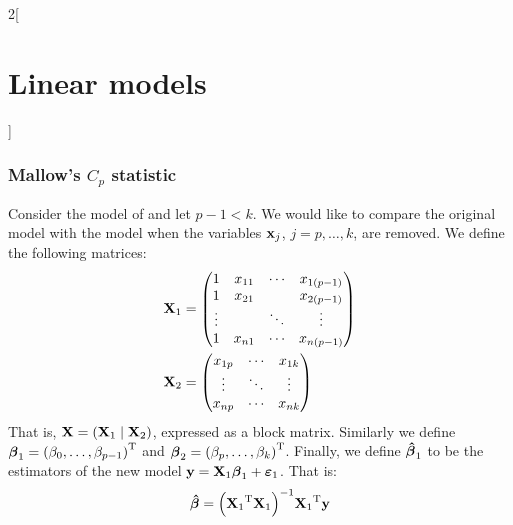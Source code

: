 \documentclass[../../../main_math.tex]{subfiles}
\begin{document}
\begin{multicols}{2}[\section{Linear models}]
\begin{theorem}
  \end{theorem}
  \subsubsection{Mallow's \texorpdfstring{$C_p$}{Cp} statistic}
  \begin{definition}
    Consider the model of  and let $p-1<k$. We would like to compare the original model with the model when the variables $\boldsymbol{\mathrm{x}}_j$, $j=p,\ldots,k$, are removed. We define the following matrices:
    \begin{align*}
      \boldsymbol{\mathrm{X}}_1 & =\begin{pmatrix}
                    1      & x_{11} & \cdots & x_{1(p-1)} \\
                    1      & x_{21} &        & x_{2(p-1)} \\
                    \vdots &        & \ddots & \vdots     \\
                    1      & x_{n1} & \cdots & x_{n(p-1)}
                  \end{pmatrix} \\
      \boldsymbol{\mathrm{X}}_2 & =\begin{pmatrix}
                    x_{1p} & \cdots & x_{1k} \\
                    \vdots & \ddots & \vdots \\
                    x_{np} & \cdots & x_{nk}
                  \end{pmatrix}
    \end{align*}
    That is, $\boldsymbol{\mathrm{X}}=(\boldsymbol{\mathrm{X}}_1 \mid \boldsymbol{\mathrm{X}}_2)$, expressed as a block matrix. Similarly we define $\boldsymbol{\mathrm{\beta}}_1={(\beta_0,\ldots,\beta_{p-1})}^{\mathrm{T}}$ and $\boldsymbol{\mathrm{\beta}}_2={(\beta_p,\ldots,\beta_{k})}^{\mathrm{T}}$. Finally, we define $\boldsymbol{\mathrm{\hat\beta}}_1$ to be the estimators of the new model $\boldsymbol{\mathrm{y}}=\boldsymbol{\mathrm{X}}_1\boldsymbol{\mathrm{\beta}}_1+\boldsymbol{\mathrm{\varepsilon}}_1$. That is: $$\boldsymbol{\mathrm{\hat\beta}}={\left({\boldsymbol{\mathrm{X}}_1}^{\mathrm{T}}\boldsymbol{\mathrm{X}}_1\right)}^{-1}{\boldsymbol{\mathrm{X}}_1}^{\mathrm{T}}\boldsymbol{\mathrm{y}}$$

\end{definition}
\end{multicols}
\end{document}
